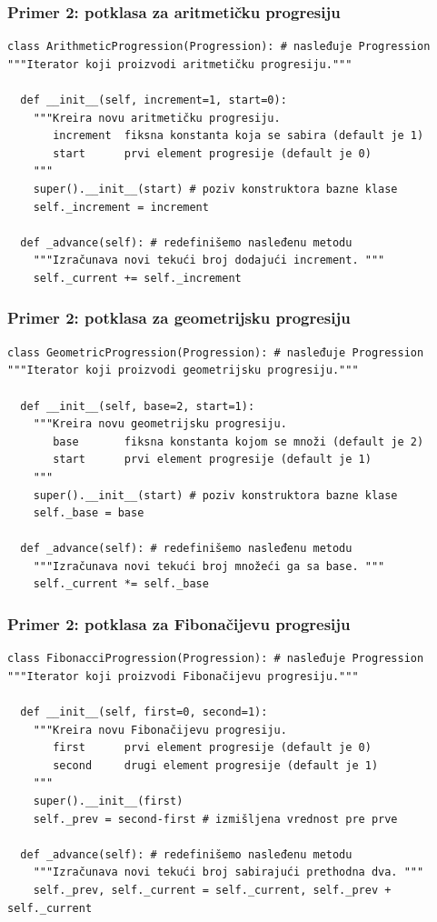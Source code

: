 \documentclass[compress]{beamer}
\begin{document}
\begin{frame}[fragile,shrink=20]
  \frametitle{Primer 2: potklasa za aritmetičku progresiju}
\begin{verbatim}
class ArithmeticProgression(Progression): # nasleđuje Progression
"""Iterator koji proizvodi aritmetičku progresiju."""

  def __init__(self, increment=1, start=0):
    """Kreira novu aritmetičku progresiju.
       increment  fiksna konstanta koja se sabira (default je 1)
       start      prvi element progresije (default je 0)
    """
    super().__init__(start) # poziv konstruktora bazne klase
    self._increment = increment
  
  def _advance(self): # redefinišemo nasleđenu metodu
    """Izračunava novi tekući broj dodajući increment. """
    self._current += self._increment
\end{verbatim}
\end{frame}

\begin{frame}[fragile,shrink=20]
  \frametitle{Primer 2: potklasa za geometrijsku progresiju}
\begin{verbatim}
class GeometricProgression(Progression): # nasleđuje Progression
"""Iterator koji proizvodi geometrijsku progresiju."""

  def __init__(self, base=2, start=1):
    """Kreira novu geometrijsku progresiju.
       base       fiksna konstanta kojom se množi (default je 2)
       start      prvi element progresije (default je 1)
    """
    super().__init__(start) # poziv konstruktora bazne klase
    self._base = base
  
  def _advance(self): # redefinišemo nasleđenu metodu
    """Izračunava novi tekući broj množeći ga sa base. """
    self._current *= self._base
\end{verbatim}
\end{frame}

\begin{frame}[fragile,shrink=20]
  \frametitle{Primer 2: potklasa za Fibonačijevu progresiju}
\begin{verbatim}
class FibonacciProgression(Progression): # nasleđuje Progression
"""Iterator koji proizvodi Fibonačijevu progresiju."""

  def __init__(self, first=0, second=1):
    """Kreira novu Fibonačijevu progresiju.
       first      prvi element progresije (default je 0)
       second     drugi element progresije (default je 1)
    """
    super().__init__(first)   
    self._prev = second-first # izmišljena vrednost pre prve
  
  def _advance(self): # redefinišemo nasleđenu metodu
    """Izračunava novi tekući broj sabirajući prethodna dva. """
    self._prev, self._current = self._current, self._prev + self._current
\end{verbatim}
\end{frame}
\end{document}

